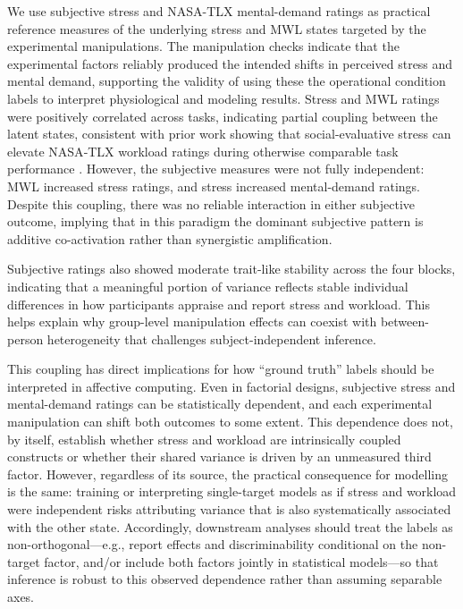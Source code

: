 \documentclass[lettersize,journal]{IEEEtran}
\begin{document}
We use subjective stress and NASA-TLX mental-demand ratings as practical reference measures of the underlying stress and MWL states targeted by the experimental manipulations. The manipulation checks indicate that the experimental factors reliably produced the intended shifts in perceived stress and mental demand, supporting the validity of using these the operational condition labels to interpret physiological and modeling results. Stress and MWL ratings were positively correlated across tasks, indicating partial coupling between the latent states, consistent with prior work showing that social-evaluative stress can elevate NASA‑TLX workload ratings during otherwise comparable task performance \cite{wetherell_psychobiological_2017}.
However, the subjective measures were not fully independent: MWL increased stress ratings, and stress increased mental-demand ratings. Despite this coupling, there was no reliable interaction in either subjective outcome, implying that in this paradigm the dominant subjective pattern is additive co-activation rather than synergistic amplification.

Subjective ratings also showed moderate trait-like stability across the four blocks, indicating that a meaningful portion of variance reflects stable individual differences in how participants appraise and report stress and workload. This helps explain why group-level manipulation effects can coexist with between-person heterogeneity that challenges subject-independent inference.

This coupling has direct implications for how “ground truth” labels should be interpreted in affective computing. Even in factorial designs, subjective stress and mental-demand ratings can be statistically dependent, and each experimental manipulation can shift both outcomes to some extent. This dependence does not, by itself, establish whether stress and workload are intrinsically coupled constructs or whether their shared variance is driven by an unmeasured third factor. However, regardless of its source, the practical consequence for modelling is the same: training or interpreting single-target models as if stress and workload were independent risks attributing variance that is also systematically associated with the other state. Accordingly, downstream analyses should treat the labels as non-orthogonal—e.g., report effects and discriminability conditional on the non-target factor, and/or include both factors jointly in statistical models—so that inference is robust to this observed dependence rather than assuming separable axes.
\end{document}
